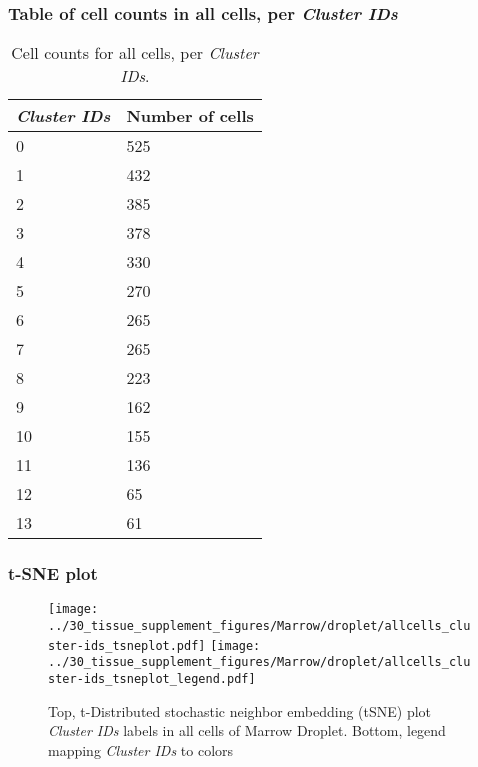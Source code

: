 \subsubsection{Table of cell counts in all cells, per \emph{Cluster IDs}}\begin{table}[h]
\centering
\label{my-label}
\begin{tabular}{@{}ll@{}}
\toprule

\emph{Cluster IDs}& Number of cells \\ \midrule
0 & 525 \\

1 & 432 \\

2 & 385 \\

3 & 378 \\

4 & 330 \\

5 & 270 \\

6 & 265 \\

7 & 265 \\

8 & 223 \\

9 & 162 \\

10 & 155 \\

11 & 136 \\

12 & 65 \\

13 & 61 \\
\bottomrule
\end{tabular}
\caption{Cell counts for all cells, per \emph{Cluster IDs}.}
\end{table}

\clearpage
\subsubsection{t-SNE plot}
\begin{figure}[h]
\centering
\texttt{[image: ../30\_tissue\_supplement\_figures/Marrow/droplet/allcells\_cluster-ids\_tsneplot.pdf]}
\texttt{[image: ../30\_tissue\_supplement\_figures/Marrow/droplet/allcells\_cluster-ids\_tsneplot\_legend.pdf]}
\caption{Top, t-Distributed stochastic neighbor embedding (tSNE) plot  \emph{Cluster IDs} labels in all cells of Marrow Droplet. Bottom, legend mapping \emph{Cluster IDs} to colors}
\end{figure}


